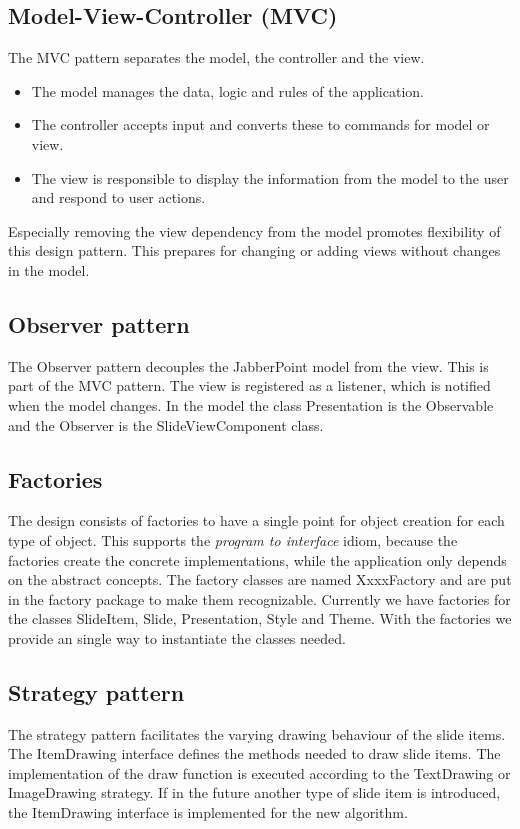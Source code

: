 \documentclass[a4paper]{article}
\begin{document}
\subsection{Model-View-Controller (MVC)}
The MVC pattern separates the model, the controller and the view.   
\begin{itemize}
\item The model manages the data, logic and rules of the application.
\item The controller accepts input and converts these to commands for model or view.
\item The view is responsible to display the information from the model to the user and respond to user actions.   
\end{itemize}
Especially removing the view dependency from the model promotes flexibility of this design pattern. This prepares for changing or adding views without changes in the model.

\subsection{Observer pattern}
The Observer pattern decouples the JabberPoint model from the view. This is part of the MVC pattern. The view is registered as a listener, which is notified when the model changes. In the model the class Presentation is the Observable and the Observer is the SlideViewComponent class.

\subsection{Factories}
The design consists of factories to have a single point for object creation for each type of object. This supports the \textit{program to interface} idiom, because the factories create the concrete implementations, while the application only depends on the abstract concepts. The factory classes are named XxxxFactory and are put in the factory package to make them recognizable.
Currently we have factories for the classes SlideItem, Slide, Presentation, Style and Theme. With the factories we provide an single way to instantiate the classes needed.

\subsection{Strategy pattern}
The strategy pattern facilitates the varying drawing behaviour of the slide items. The ItemDrawing interface defines the methods needed to draw slide items. The implementation of the draw function is executed according to the TextDrawing or ImageDrawing strategy. If  in the future another type of slide item is introduced, the ItemDrawing interface is implemented for the new algorithm.
\end{document}
